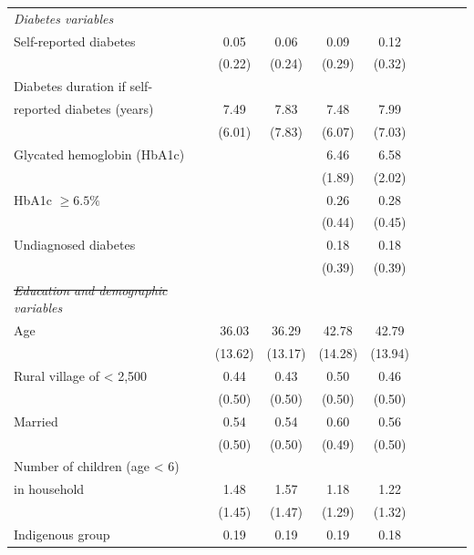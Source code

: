 \documentclass[12pt,english]{article}
\providecommand{\DIFaddtex}[1]{{\protect\color{blue}\uwave{#1}}} %
\providecommand{\DIFdeltex}[1]{{\protect\color{red}\sout{#1}}}                      %
\providecommand{\DIFaddFL}[1]{\DIFadd{#1}} %
\providecommand{\DIFdelFL}[1]{\DIFdel{#1}} %
\providecommand{\DIFaddbeginFL}{} %
\providecommand{\DIFaddendFL}{} %
\providecommand{\DIFdelbeginFL}{} %
\providecommand{\DIFdelendFL}{} %
\providecommand{\DIFadd}[1]{\texorpdfstring{\DIFaddtex{#1}}{#1}} %
\providecommand{\DIFdel}[1]{\texorpdfstring{\DIFdeltex{#1}}{}} %
\begin{document}
\begin{table}[p]
\begin{adjustbox}{max width=0.7\linewidth, center}
\begin{threeparttable}
{\begin{tabular}{l*{4}{SS}}
\hspace*{10mm}\emph{Diabetes variables} \\
Self-reported diabetes  &         0.05&        0.06&        0.09&        0.12\\
                    &      (0.22)&      (0.24)&      (0.29)&      (0.32)\\
Diabetes duration if self- &&&&\\
reported diabetes (years)   &        7.49&        7.83&        7.48&        7.99\\
                    &      (6.01)&      (7.83)&      (6.07)&      (7.03)\\
Glycated hemoglobin (HbA1c)&            &            &       6.46&        6.58\\
                    &            &            &      (1.89)&      (2.02)\\
HbA1c $\geq 6.5\%$  &            &            &        0.26&        0.28\\
                    &            &            &      (0.44)&      (0.45)\\
Undiagnosed diabetes&            &            &        0.18&        0.18\\
                    &            &            &      (0.39)&      (0.39)\\
\hspace*{10mm}\emph{\DIFdelbeginFL \DIFdelFL{Education and demographic }\DIFdelendFL \DIFaddbeginFL \DIFaddFL{Control }\DIFaddendFL variables} \\
Age                 &       36.03&       36.29&       42.78&       42.79\\
                    &     (13.62)&     (13.17)&     (14.28)&     (13.94)\\
Rural village of < 2,500&        0.44&        0.43&        0.50&        0.46\\
                    &      (0.50)&      (0.50)&      (0.50)&      (0.50)\\
Married             &        0.54&        0.54&        0.60&        0.56\\
                    &      (0.50)&      (0.50)&      (0.49)&      (0.50)\\
Number of children (age < 6) &&&&\\
in household&        1.48&        1.57&        1.18&        1.22\\
                    &      (1.45)&      (1.47)&      (1.29)&      (1.32)\\
Indigenous group    &        0.19&        0.19&        0.19&        0.18\\

\end{tabular}}
\end{threeparttable}
\end{adjustbox}
\end{table}
\end{document}
